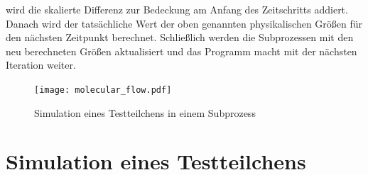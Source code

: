 \documentclass{listhesis}
\begin{document}
wird die skalierte Differenz zur Bedeckung am Anfang des Zeitschritts addiert. Danach wird der tatsächliche Wert der oben genannten physikalischen Größen für den nächsten Zeitpunkt berechnet. Schließlich werden die Subprozessen mit den neu berechneten Größen aktualisiert und das Programm macht mit der nächsten Iteration weiter.

\begin{figure}[t]
\centering
\texttt{[image: molecular\_flow.pdf]}
\caption{Simulation eines Testteilchens in einem Subprozess}
\label{fig:simulation}
\end{figure}

\section{Simulation eines Testteilchens} \label{section:molflow}
\end{document}
